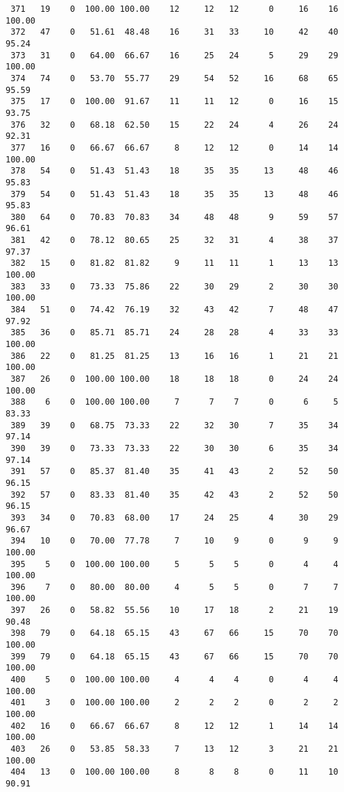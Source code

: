 \begin{verbatim}
 371   19    0  100.00 100.00    12     12   12      0     16    16   100.00
 372   47    0   51.61  48.48    16     31   33     10     42    40    95.24
 373   31    0   64.00  66.67    16     25   24      5     29    29   100.00
 374   74    0   53.70  55.77    29     54   52     16     68    65    95.59
 375   17    0  100.00  91.67    11     11   12      0     16    15    93.75
 376   32    0   68.18  62.50    15     22   24      4     26    24    92.31
 377   16    0   66.67  66.67     8     12   12      0     14    14   100.00
 378   54    0   51.43  51.43    18     35   35     13     48    46    95.83
 379   54    0   51.43  51.43    18     35   35     13     48    46    95.83
 380   64    0   70.83  70.83    34     48   48      9     59    57    96.61
 381   42    0   78.12  80.65    25     32   31      4     38    37    97.37
 382   15    0   81.82  81.82     9     11   11      1     13    13   100.00
 383   33    0   73.33  75.86    22     30   29      2     30    30   100.00
 384   51    0   74.42  76.19    32     43   42      7     48    47    97.92
 385   36    0   85.71  85.71    24     28   28      4     33    33   100.00
 386   22    0   81.25  81.25    13     16   16      1     21    21   100.00
 387   26    0  100.00 100.00    18     18   18      0     24    24   100.00
 388    6    0  100.00 100.00     7      7    7      0      6     5    83.33
 389   39    0   68.75  73.33    22     32   30      7     35    34    97.14
 390   39    0   73.33  73.33    22     30   30      6     35    34    97.14
 391   57    0   85.37  81.40    35     41   43      2     52    50    96.15
 392   57    0   83.33  81.40    35     42   43      2     52    50    96.15
 393   34    0   70.83  68.00    17     24   25      4     30    29    96.67
 394   10    0   70.00  77.78     7     10    9      0      9     9   100.00
 395    5    0  100.00 100.00     5      5    5      0      4     4   100.00
 396    7    0   80.00  80.00     4      5    5      0      7     7   100.00
 397   26    0   58.82  55.56    10     17   18      2     21    19    90.48
 398   79    0   64.18  65.15    43     67   66     15     70    70   100.00
 399   79    0   64.18  65.15    43     67   66     15     70    70   100.00
 400    5    0  100.00 100.00     4      4    4      0      4     4   100.00
 401    3    0  100.00 100.00     2      2    2      0      2     2   100.00
 402   16    0   66.67  66.67     8     12   12      1     14    14   100.00
 403   26    0   53.85  58.33     7     13   12      3     21    21   100.00
 404   13    0  100.00 100.00     8      8    8      0     11    10    90.91

\end{verbatim}
